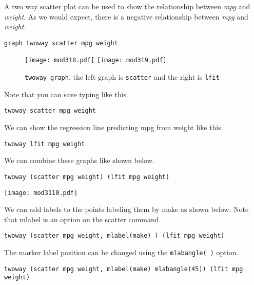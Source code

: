 A two way scatter plot can be used to show the relationship between \textit{mpg} and \textit{weight}. As we would expect, there is a negative relationship between \textit{mpg} and \textit{weight}.

\begin{lstlisting}
graph twoway scatter mpg weight
\end{lstlisting}

\begin{figure}[!htbp]
\centering
\texttt{[image: mod318.pdf]}
\texttt{[image: mod319.pdf]}
\caption{\lstinline{twoway graph}, the left graph is \lstinline{scatter} and the right is \lstinline{lfit}\label{twoway}}
\end{figure}

Note that you can save typing like this

\begin{lstlisting}
twoway scatter mpg weight
\end{lstlisting}

We can show the regression line predicting mpg from weight like this.

\begin{lstlisting}
twoway lfit mpg weight
\end{lstlisting}


We can combine these graphs like shown below.

\begin{lstlisting}
twoway (scatter mpg weight) (lfit mpg weight)
\end{lstlisting}

\begin{center}
\texttt{[image: mod3110.pdf]}
\end{center}

We can add labels to the points labeling them by make as shown below. Note that mlabel is an option on the scatter command.

\begin{lstlisting}
twoway (scatter mpg weight, mlabel(make) ) (lfit mpg weight)
\end{lstlisting}


The marker label position can be changed using the \lstinline{mlabangle( )} option.

\begin{lstlisting}
twoway (scatter mpg weight, mlabel(make) mlabangle(45)) (lfit mpg weight)
\end{lstlisting}

